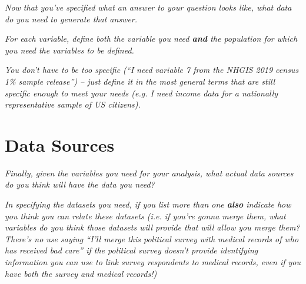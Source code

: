 \documentclass[12pt]{article}
\begin{document}
\emph{Now that you've specified what an answer to your question looks like, what data do you need to generate that answer.}

\emph{For each variable, define both the variable you need \textbf{and} the population for which you need the variables to be defined.}

\emph{You don't have to be too specific (``I need variable 7 from the NHGIS 2019 census 1\% sample release'') -- just define it in the most general terms that are still specific enough to meet your needs (e.g. I need income data for a nationally representative sample of US citizens). }

\section{Data Sources}\label{section_datasources}

\emph{Finally, given the variables you need for your analysis, what actual data sources do you think will have the data you need?}

\emph{In specifying the datasets you need, if you list more than one \textbf{also} indicate how you think you can relate these datasets (i.e. if you're gonna merge them, what variables do you think those datasets will provide that will allow you merge them? There's no use saying ``I'll merge this political survey with medical records of who has received bad care'' if the political survey doesn't provide identifying information you can use to link survey respondents to medical records, even if you have both the survey and medical records!)}
\end{document}
